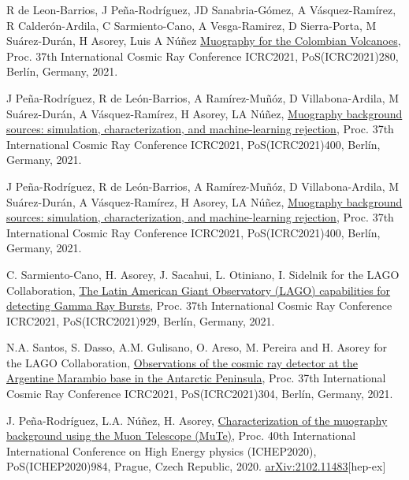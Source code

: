 \begin{etaremune}
\item {} R de Leon-Barrios, J Peña-Rodríguez, JD Sanabria-Gómez, A Vásquez-Ramírez, R Calderón-Ardila, C Sarmiento-Cano, A Vesga-Ramirez, D Sierra-Porta, M Suárez-Durán, H Asorey, Luis A Núñez \href{https://doi.org/10.22323/1.395.0280}{Muography for the Colombian Volcanoes}, \en Proc. 37th International Cosmic Ray Conference ICRC2021, PoS(ICRC2021)280, Berlín, Germany, 2021.

\item {} J Peña-Rodríguez, R de León-Barrios, A Ramírez-Muñóz, D Villabona-Ardila, M Suárez-Durán, A Vásquez-Ramírez, H Asorey, LA Núñez, \href{https://doi.org/10.22323/1.395.0400}{Muography background sources: simulation, characterization, and machine-learning rejection}, \en Proc. 37th International Cosmic Ray Conference ICRC2021, PoS(ICRC2021)400, Berlín, Germany, 2021.

\item {} J Peña-Rodríguez, R de León-Barrios, A Ramírez-Muñóz, D Villabona-Ardila, M Suárez-Durán, A Vásquez-Ramírez, H Asorey, LA Núñez, \href{https://doi.org/10.22323/1.395.0400}{Muography background sources: simulation, characterization, and machine-learning rejection}, \en Proc. 37th International Cosmic Ray Conference ICRC2021, PoS(ICRC2021)400, Berlín, Germany, 2021.

\item {} C. Sarmiento-Cano, H. Asorey, J. Sacahui, L. Otiniano, I. Sidelnik for the LAGO Collaboration, \href{https://doi.org/10.22323/1.395.0929}{The Latin American Giant Observatory (LAGO) capabilities for detecting Gamma Ray Bursts}, \en Proc. 37th International Cosmic Ray Conference ICRC2021, PoS(ICRC2021)929, Berlín, Germany, 2021.

\item {} N.A. Santos, S. Dasso, A.M. Gulisano, O. Areso, M. Pereira and H. Asorey for the LAGO Collaboration, \href{https://doi.org/10.22323/1.395.304}{Observations of the cosmic ray detector at the Argentine Marambio base in the Antarctic Peninsula}, \en Proc. 37th International Cosmic Ray Conference ICRC2021, PoS(ICRC2021)304, Berlín, Germany, 2021.

\item {} J. Peña-Rodríguez, L.A. Núñez, H. Asorey, \href{https://doi.org/10.22323/1.390.0984}{Characterization of the muography background using the Muon Telescope (MuTe)}, \en Proc. 40th International International Conference on High Energy physics (ICHEP2020), PoS(ICHEP2020)984, Prague,  Czech Republic, 2020. \href{http://arxiv.org/abs/2102.11483}{arXiv:2102.11483}[hep-ex]


\end{etaremune}
